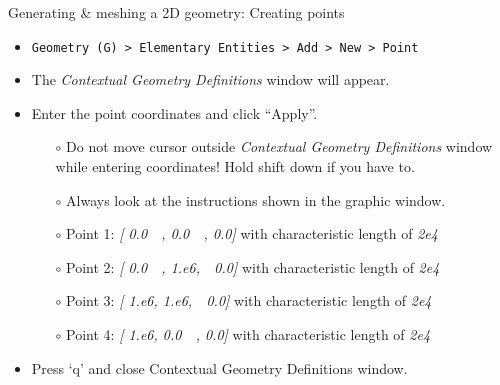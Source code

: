 \documentclass[t]{beamer}
\begin{document}
\begin{frame}{Generating \& meshing a 2D geometry: Creating points}
  \begin{itemize}
  \item \lstinline{Geometry (G) > Elementary Entities > Add > New > Point}\\[4pt]
  \item The \emph{Contextual Geometry Definitions} window will appear.\\[4pt]
  \item Enter the point coordinates and click ``Apply''.\\[4pt]
  \begin{itemize}
    \item[$\circ$] Do not move cursor outside \emph{Contextual Geometry Definitions} window while entering coordinates! Hold shift down if you have to.\\[4pt]
    \item[$\circ$] Always look at the instructions shown in the graphic window.\\[4pt]
    \item[$\circ$] Point 1: \emph{[ 0.0\ \ ,  0.0\ \ ,  0.0]} with characteristic length of \emph{2e4}\\[5pt]
    \item[$\circ$] Point 2: \emph{[ 0.0\ \ ,  1.e6,\ \ 0.0]} with characteristic length of \emph{2e4}\\[5pt]
    \item[$\circ$] Point 3: \emph{[ 1.e6, 1.e6,\ \ 0.0]} with characteristic length of \emph{2e4}\\[5pt]
    \item[$\circ$] Point 4: \emph{[ 1.e6, 0.0\ \ ,  0.0]} with characteristic length of \emph{2e4}\\[5pt]
    \end{itemize}
  \item Press `q' and close Contextual Geometry Definitions window.
  \end{itemize}
\end{frame}
\end{document}
